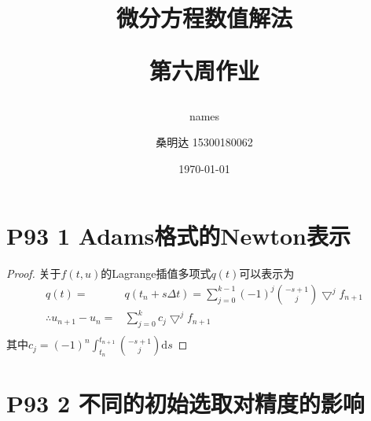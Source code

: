\documentclass{article}%
\author{names}
\title{\heiti 微分方程数值解法\\ [2ex] \begin{large} 第六周作业 \end{large}}
\author{\kaishu 桑明达 15300180062}
\date{\today}
\begin{document}
\maketitle


\section{P93 1 Adams格式的Newton表示}

\begin{proof}
	关于$ f\left ( t,u \right ) $的Lagrange插值多项式$ q\left ( t \right ) $可以表示为
\begin{align*}
	q\left ( t \right )=& q\left ( t_{n}+s\Delta t \right )=\sum_{j=0}^{k-1}\left (-1  \right )^{j}\binom{-s+1}{j}\bigtriangledown ^{j}f_{n+1} \\
	\therefore u_{n+1}-u_{n} =& \sum_{j=0}^{k}c_j \bigtriangledown ^j f_{n+1} \\
\end{align*}
    其中$c_j= \left (-1  \right )^{n}\int_{t_n}^{t_{n+1}}\binom{-s+1}{j} \mathrm{d} s $
\end{proof}

\section{P93 2 不同的初始选取对精度的影响}
\end{document}
